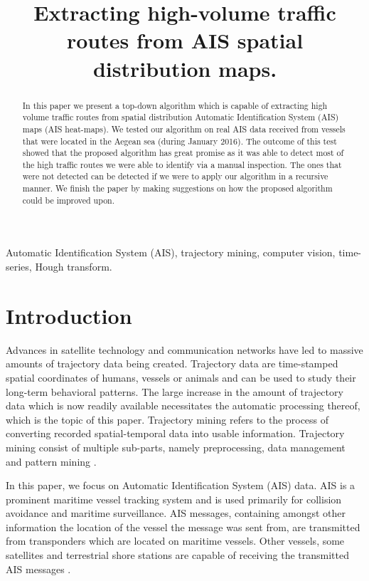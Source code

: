 \documentclass{article}
\title{Extracting high-volume traffic routes from AIS spatial distribution maps.}
\begin{document}
%
\maketitle
%
\begin{abstract}
In this paper we present a top-down algorithm which is capable of extracting high volume traffic routes from spatial distribution Automatic Identification System (AIS) maps (AIS heat-maps).
We tested our algorithm on real AIS data received from vessels that were located in the Aegean sea (during January 2016). The outcome of this test 
showed that the proposed algorithm has great promise as it was able to detect most of the high traffic routes we were able to identify via a manual inspection. The ones that were not detected can be detected if we were 
to apply our algorithm in a recursive manner. We finish the paper by making suggestions on how the proposed algorithm could be improved upon.
\end{abstract}
%
\begin{keywords}
Automatic Identification System (AIS), trajectory mining, computer vision, time-series, Hough transform.
\end{keywords}

\section{Introduction}
Advances in satellite technology and communication networks have led to massive amounts of trajectory data being created. 
Trajectory data are time-stamped spatial coordinates of humans, vessels or animals and can be used to study their long-term behavioral patterns. The large increase 
in the amount of trajectory data which is now readily available necessitates the automatic processing thereof, which is the topic of this paper.
Trajectory mining refers to the process of converting recorded spatial-temporal data into usable information. Trajectory mining consist of multiple sub-parts, namely 
preprocessing, data management and pattern mining \cite{zheng2015}.

In this paper, we focus on Automatic Identification System (AIS) data. AIS is a prominent maritime vessel tracking system and is used primarily 
for collision avoidance and maritime surveillance. AIS messages, containing amongst other information the location of the vessel the message was sent from, are transmitted from transponders which are located 
on maritime vessels. Other vessels, some satellites and terrestrial shore stations are capable of receiving the transmitted AIS messages \cite{li2017}.
\end{document}
